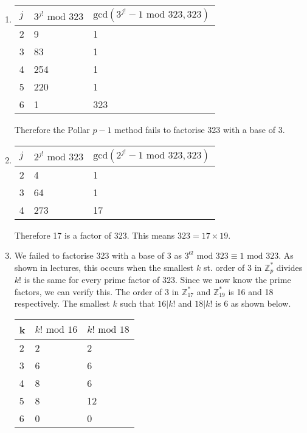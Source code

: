 \begin{enumerate}

\item
\begin{tabular}{l l l}
\hline$j$ & $3^{j!} \text{ mod } 323$ & $\text{gcd}(3^{j!} - 1  \text{ mod } 323, 323)$ \\ \hline
2 & 9 & 1 \\ \hline
3 & 83 & 1 \\ \hline
4 & 254 & 1 \\ \hline
5 & 220 & 1 \\ \hline
6 & 1 & 323 \\ \hline
\end{tabular}

Therefore the Pollar $p-1$ method fails to factorise 323 with a base of 3.

\item
\begin{tabular}{l l l}
\hline$j$ & $2^{j!} \text{ mod } 323$ & $\text{gcd}(2^{j!} - 1  \text{ mod } 323, 323)$ \\ \hline
2 & 4 & 1 \\ \hline
3 & 64 & 1 \\ \hline
4 & 273 & 17 \\ \hline
\end{tabular}

Therefore 17 is a factor of 323. This means $323 = 17 \times 19$.

\item We failed to factorise 323 with a base of 3 as $3^{6!} \text{ mod } 323 \equiv 1 \text { mod } 323$. As shown in lectures, this occurs when the smallest $k$ st. order of 3 in $\mathbb{Z}_p^*$ divides $k!$ is the same for every prime factor of $323$. Since we now know the prime factors, we can verify this. The order of $3$ in $\mathbb{Z}_{17}^*$ and $\mathbb{Z}_{19}^*$ is 16 and 18 respectively. The smallest $k$ such that $16 | k!$ and $18 | k!$ is 6 as shown below.

\begin{tabular}{l l l}
\hline k & $k! \text{ mod } 16$ & $k! \text{ mod } 18$ \\ \hline
2 & 2 & 2 \\ \hline
3 & 6 & 6 \\ \hline
4 & 8 & 6 \\ \hline
5 & 8 & 12 \\ \hline
6 & 0 & 0 \\ \hline
\end{tabular}


\end{enumerate}
